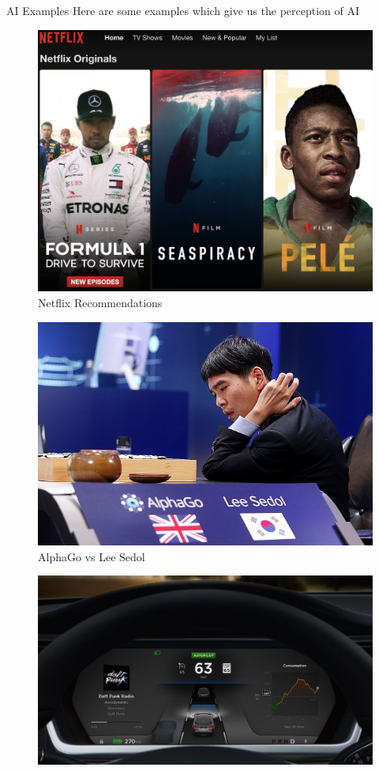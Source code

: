 \documentclass{beamer}
\begin{document}
\begin{frame}[allowframebreaks]{AI Examples}
{\large Here are some examples which give us the perception of AI}
\begin{figure}
\centering
\captionsetup{justification=centering}
\includegraphics[scale=0.30]{NFLX.png}
\caption{Netflix Recommendations}
\end{figure}
\framebreak
\begin{figure}
\centering
\captionsetup{justification=centering}
\includegraphics[scale=0.30]{alphago.jpeg}
\caption{AlphaGo vs Lee Sedol}
\end{figure}
\framebreak
\begin{figure}
\centering
\captionsetup{justification=centering}
\includegraphics[scale=0.20]{autopilot.jpeg}

\end{figure}
\end{frame}
\end{document}
